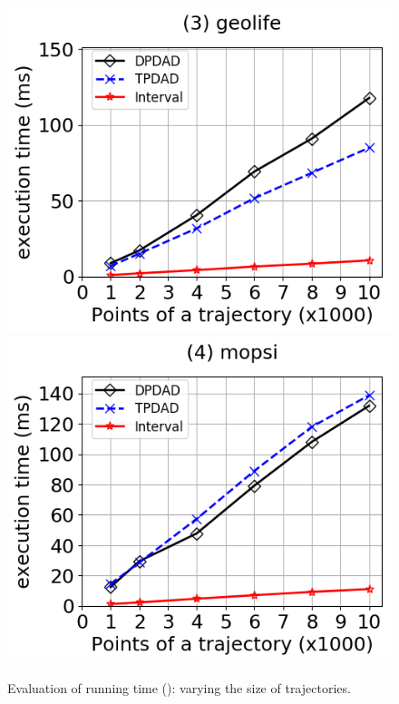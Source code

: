 \begin{figure}[tb!]
	\includegraphics[scale=0.315]{Figures/Exp-DAD-time-size-geolife.png}	\hspace{1ex}
	\includegraphics[scale=0.315]{Figures/Exp-DAD-time-size-mopsi.png}		
	\vspace{-3ex}
	\caption{\small Evaluation of running time (\dad): varying the size of trajectories.}\label{fig:time-size-dad}
	\vspace{-2ex}
\end{figure}






